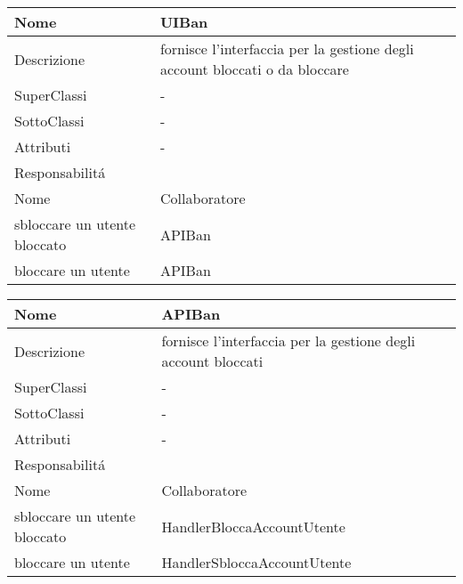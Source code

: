
\begin{center} %
    \begin{longtable}{ |p{3cm}|p{3cm}|p{3cm}|p{3cm}| }
        \hline
        Nome & \multicolumn{3}{|p{9cm}|}{UIBan} \\\hline
        Descrizione & \multicolumn{3}{|p{9cm}|}{fornisce l'interfaccia per la gestione degli account bloccati o da bloccare} \\\hline
        SuperClassi & \multicolumn{3}{|p{9cm}|}{-} \\\hline
        SottoClassi & \multicolumn{3}{|p{9cm}|}{-} \\\hline
        Attributi & \multicolumn{3}{|p{9cm}|}{-} \\\hline
        \multicolumn{4}{|p{12cm}|}{Responsabilit\'a} \\\hline %
        \multicolumn{2}{|p{6cm}|}{Nome} & \multicolumn{2}{|p{6cm}|}{Collaboratore} \\\hline %
        \multicolumn{2}{|p{6cm}|}{sbloccare un utente bloccato} & \multicolumn{2}{|p{6cm}|}{APIBan} \\\hline        
        \multicolumn{2}{|p{6cm}|}{bloccare un utente} & \multicolumn{2}{|p{6cm}|}{APIBan} \\\hline        
    \end{longtable}
\end{center}

\begin{center} %
    \begin{longtable}{ |p{3cm}|p{3cm}|p{3cm}|p{3cm}| }
        \hline
        Nome & \multicolumn{3}{|p{9cm}|}{APIBan} \\\hline
        Descrizione & \multicolumn{3}{|p{9cm}|}{fornisce l'interfaccia per la gestione degli account bloccati} \\\hline
        SuperClassi & \multicolumn{3}{|p{9cm}|}{-} \\\hline
        SottoClassi & \multicolumn{3}{|p{9cm}|}{-} \\\hline
        Attributi & \multicolumn{3}{|p{9cm}|}{-} \\\hline
        \multicolumn{4}{|p{12cm}|}{Responsabilit\'a} \\\hline %
        \multicolumn{2}{|p{6cm}|}{Nome} & \multicolumn{2}{|p{6cm}|}{Collaboratore} \\\hline %
        \multicolumn{2}{|p{6cm}|}{sbloccare un utente bloccato} & \multicolumn{2}{|p{6cm}|}{HandlerBloccaAccountUtente} \\\hline        
        \multicolumn{2}{|p{6cm}|}{bloccare un utente} & \multicolumn{2}{|p{6cm}|}{HandlerSbloccaAccountUtente} \\\hline        
    \end{longtable}
\end{center}

